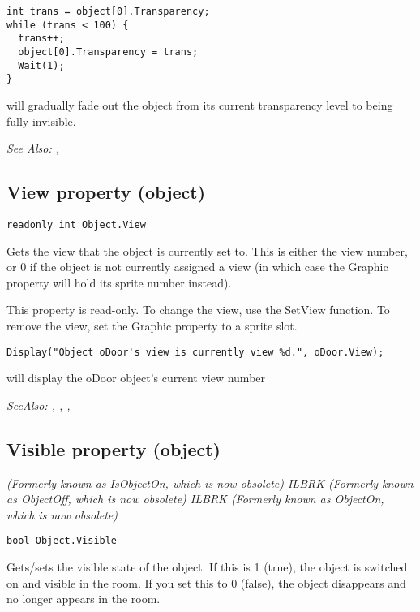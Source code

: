 \begin{verbatim}
int trans = object[0].Transparency;
while (trans < 100) {
  trans++;
  object[0].Transparency = trans;
  Wait(1);
}
\end{verbatim}
will gradually fade out the object from its current transparency level to being fully
invisible.

\it{See Also:} ,


\subsection{View property (object)}\label{Object.View}%

\begin{verbatim}
readonly int Object.View
\end{verbatim}
Gets the view that the object is currently set to. This is either the view number, or 0
if the object is not currently assigned a view (in which case the Graphic property will
hold its sprite number instead).

This property is read-only. To change the view, use the SetView function. To remove
the view, set the Graphic property to a sprite slot.

\begin{verbatim}
Display("Object oDoor's view is currently view %d.", oDoor.View);
\end{verbatim}
will display the oDoor object's current view number

\it{SeeAlso:} ,
, ,


\subsection{Visible property (object)}\label{Object.Visible}%

\it{(Formerly known as IsObjectOn, which is now obsolete)} ILBRK
\it{(Formerly known as ObjectOff, which is now obsolete)} ILBRK
\it{(Formerly known as ObjectOn, which is now obsolete)}

\begin{verbatim}
bool Object.Visible
\end{verbatim}
Gets/sets the visible state of the object. If this is 1 (true), the object is switched on
and visible in the room. If you set this to 0 (false), the object disappears and no longer
appears in the room.

